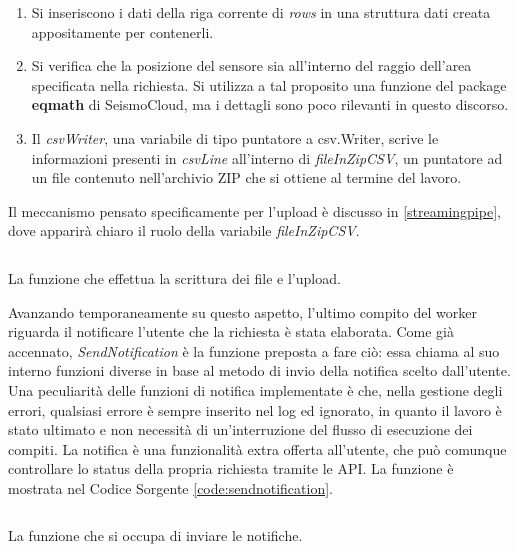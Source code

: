 \begin{enumerate}
    \item Si inseriscono i dati della riga corrente di \textit{rows} in una struttura dati creata appositamente per contenerli.
    \item Si verifica che la posizione del sensore sia all'interno del raggio dell'area specificata nella richiesta. Si utilizza a tal proposito una funzione del package \textbf{eqmath} di SeismoCloud, ma i dettagli sono poco rilevanti in questo discorso.
    \item Il \textit{csvWriter}, una variabile di tipo puntatore a csv.Writer, scrive le informazioni presenti in \textit{csvLine} all'interno di \textit{fileInZipCSV}, un puntatore ad un file contenuto nell'archivio ZIP che si ottiene al termine del lavoro.
\end{enumerate}
Il meccanismo pensato specificamente per l'upload è discusso in \ref{streamingpipe}, dove apparirà chiaro il ruolo della variabile \textit{fileInZipCSV}.
\begin{listing}[h!]
\inputminted[baselinestretch=0.8]{go}{sources/uploadcsv.go}
\caption{La funzione che effettua la scrittura dei file e l'upload.}
\label{code:uploadcsv}
\end{listing}
Avanzando temporaneamente su questo aspetto, l'ultimo compito del worker riguarda il notificare l'utente che la richiesta è stata elaborata. Come già accennato, \textit{SendNotification} è la funzione preposta a fare ciò: essa chiama al suo interno funzioni diverse in base al metodo di invio della notifica scelto dall'utente. Una peculiarità delle funzioni di notifica implementate è che, nella gestione degli errori, qualsiasi errore è sempre inserito nel log ed ignorato, in quanto il lavoro è stato ultimato e non necessità di un'interruzione del flusso di esecuzione dei compiti. La notifica è una funzionalità extra offerta all'utente, che può comunque controllare lo status della propria richiesta tramite le API. La funzione è mostrata nel Codice Sorgente \ref{code:sendnotification}.
\begin{listing}[h!]
\inputminted[baselinestretch=0.8]{go}{sources/sendnotification.go}
\caption{La funzione che si occupa di inviare le notifiche.}
\label{code:sendnotification}
\end{listing}

